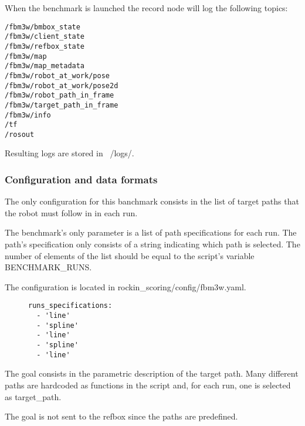 \documentclass[a4paper]{article}
\begin{document}
\label{sec:fbm3w_record_node}

When the benchmark is launched the record node will log the following topics:

\begin{verbatim}
/fbm3w/bmbox_state
/fbm3w/client_state
/fbm3w/refbox_state
/fbm3w/map
/fbm3w/map_metadata
/fbm3w/robot_at_work/pose
/fbm3w/robot_at_work/pose2d
/fbm3w/robot_path_in_frame
/fbm3w/target_path_in_frame
/fbm3w/info
/tf
/rosout
\end{verbatim} 

Resulting logs are stored in ~/logs/.

\clearpage

\subsubsection{Configuration and data formats}

The only configuration for this banchmark consists in the list of target paths that the robot must follow in in each run.

\label{sec:fbm3w_parameters_format}

The benchmark's only parameter is a list of path specifications for each run.
The path's specification only consists of a string indicating which path is selected.
The number of elements of the list should be equal to the script's variable BENCHMARK_RUNS.

The configuration is located in rockin_scoring/config/fbm3w.yaml.

\begin{figure}[h!]
	\noindent
	\begin{minipage}[t!]{\linewidth}
		\begin{lstlisting}[caption=fbm3w.yaml]
runs_specifications:
  - 'line'
  - 'spline'
  - 'line'
  - 'spline'
  - 'line'
    \end{lstlisting}
	\end{minipage}
\end{figure}

\label{sec:fbm3w_goal_data_format}

The goal consists in the parametric description of the target path.
Many different paths are hardcoded as functions in the script and, for each run, one is selected as target_path.

The goal is not sent to the refbox since the paths are predefined.
\end{document}
